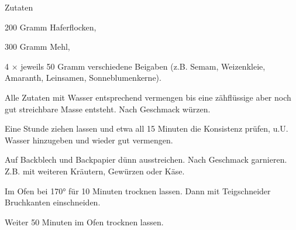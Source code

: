 \startsection[title={Knäckebrot},reference=knaeckebrot]

\startitemize
\item Zutaten
      \startitemize
      \item 200 Gramm Haferflocken,
      \item 300 Gramm Mehl,
      \item 4 × jeweils 50 Gramm verschiedene Beigaben (z.B. Semam, Weizenkleie, Amaranth, Leinsamen, Sonneblumenkerne).
      \stopitemize

\item Alle Zutaten mit Wasser entsprechend vermengen bis eine
      zähflüssige aber noch gut streichbare Masse entsteht. Nach
      Geschmack würzen.
\item Eine Stunde ziehen lassen und etwa all 15 Minuten die Konsistenz
      prüfen, u.U. Wasser hinzugeben und wieder gut  vermengen.
\item Auf Backblech und Backpapier dünn ausstreichen. Nach Geschmack
      garnieren. Z.B. mit weiteren Kräutern, Gewürzen oder Käse.
\item Im Ofen bei 170° für 10 Minuten trocknen lassen. Dann mit
      Teigschneider Bruchkanten einschneiden.
\item Weiter 50 Minuten im Ofen trocknen lassen.
\stopitemize

\stopsection
